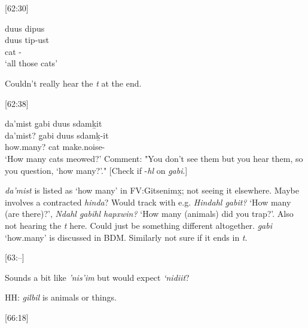 [62:30] \begin{exe}
    \ex \glll
    duus dipus \\
    duus tip-ust \\
    cat \Dem-\Dist \\
    \glt `all those cats'
\end{exe}

Couldn't really hear the \textit{t} at the end.

[62:38] \begin{exe}
    \ex \glll
    da'mist g̱abi duus sdamḵit  \\
    da'mist? g̱abi duus sdamḵ-it \\ 
    how.many? \Cnt{} cat make.noise-\Sx \\
    \glt `How many cats meowed?' Comment: "You don't see them but you hear them, so you question, `how many?'." [Check if -\textit{hl} on \textit{g̱abi}.]
\end{exe}

\textit{da’mist} is listed as `how many' in FV:Gitsenimx̱; not seeing it elsewhere. Maybe involves a contracted \textit{hinda}? Would track with e.g. \textit{Hindahl g̱abit?} `How many (are there)?', \textit{Ndahl g̱abihl hapxwin?} `How many (animals) did you trap?'. Also not hearing the \textit{t} here. Could just be something different altogether. \textit{g̱abi} `how.many' is discussed in BDM. Similarly not sure if it ends in \textit{t}.

[63:--]

\begin{exe}
\end{exe}

\begin{exe}
\end{exe}

Sounds a bit like \textit{'nis'im} but would expect \textit{‘nidiit}?

HH: \textit{gilbil} is animals or things.

[66:18]
\begin{exe}
\end{exe}

\begin{exe}
\end{exe}

